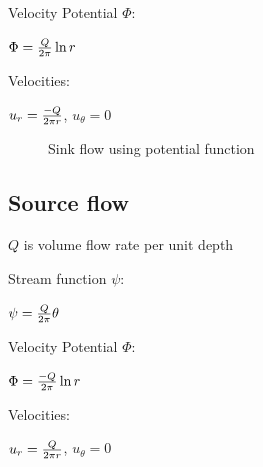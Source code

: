 Velocity Potential $\Phi$:

$\Phi = {Q \over 2\pi} \ln r$

Velocities:

$u_r = {-Q \over 2 \pi r}$,  $u_\theta = 0$

\begin{figure}[h]
\begin{center}
\end{center}
\caption{Sink flow using potential function}
\label{planarsinkflow}
\end{figure}


\subsection{Source flow}

$Q$ is  volume flow rate per unit depth

Stream function $\psi$:

$\psi = {Q \over 2\pi} \theta$

Velocity Potential $\Phi$:

$\Phi = {-Q \over 2\pi} \ln r$

Velocities:

$u_r = {Q \over 2\pi r}$,  $u_\theta = 0$

